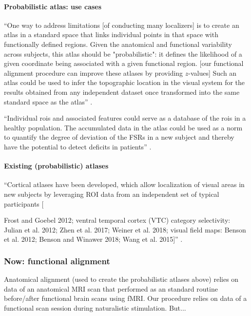 \paragraph{Probabilistic atlas: use cases}
%
``One way to address limitations [of conducting many localizers] is to create an
atlas in a standard space that links individual points in that space with
functionally defined regions.
%
Given the anatomical and functional variability across subjects, this atlas
should be "probabilistic":
%
it defines the likelihood of a given coordinate being associated with a given
functional region. [our functional alignment procedure can improve these atlases
by providing $z$-values]
%
Such an atlas could be used to infer the topographic location in the visual
system for the results obtained from any independent dataset once transformed
into the same standard space as the atlas'' \citep{wang2015probabilistic}.

%
``Individual \acp{roi} and associated features could serve as a database of the
\acp{roi} in a healthy population.
%
The accumulated data in the atlas could be used as a norm to quantify the degree
of deviation of the FSRs in a new subject and thereby have the potential to
detect deficits in patients'' \citep{zhen2015quantifying}.


\paragraph{Existing (probabilistic) atlases}

``Cortical atlases have been developed, which allow localization of visual areas
in new subjects by leveraging ROI data from an independent set of typical
participants [

    Frost and Goebel 2012;
    ventral temporal cortex (VTC) category selectivity:
    Julian et al. 2012;
    Zhen et al. 2017;
    Weiner et al. 2018;
    visual field maps:
    Benson et al. 2012;
    Benson and Winawer 2018;
    Wang et al. 2015]'' \citep{rosenke2021probabilistic}.




\subsubsection{Now: functional alignment}

%
Anatomical alignment (used to create the probabilistic atlases above) relies on
data of an anatomical MRI scan that performed as an standard routine
before/after functional brain scans using fMRI.
%
Our procedure relies on data of a functional scan session during naturalistic
stimulation.
%
But...


